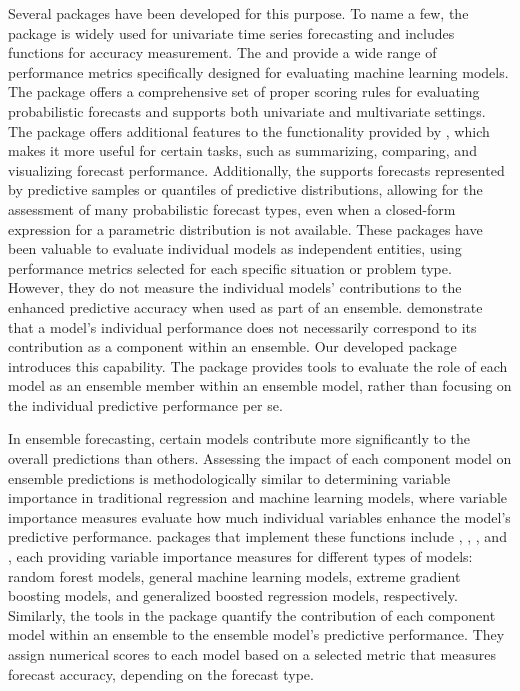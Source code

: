 \documentclass[
  article,
  shortnames,
  notitle]{jss}
\begin{document}
Several  packages have been developed for this purpose. To
name a few, the  package \citep{Rpackage-forecast} is
widely used for univariate time series forecasting and includes
functions for accuracy measurement. The 
\citep{Rpackage-Metrics} and  \citep{Rpackage-MLmetrics}
provide a wide range of performance metrics specifically designed for
evaluating machine learning models. The 
\citep{Rpackage-scoringRules} package offers a comprehensive set of
proper scoring rules for evaluating probabilistic forecasts and supports
both univariate and multivariate settings. The 
\citep{bosse2022evaluating} package offers additional features to the
functionality provided by , which makes it more useful
for certain tasks, such as summarizing, comparing, and visualizing
forecast performance. Additionally, the  supports
forecasts represented by predictive samples or quantiles of predictive
distributions, allowing for the assessment of many probabilistic
forecast types, even when a closed-form expression for a parametric
distribution is not available. These packages have been valuable to
evaluate individual models as independent entities, using performance
metrics selected for each specific situation or problem type. However,
they do not measure the individual models' contributions to the enhanced
predictive accuracy when used as part of an ensemble. \citet{kim2024}
demonstrate that a model's individual performance does not necessarily
correspond to its contribution as a component within an ensemble. Our
developed package introduces this capability. The 
package provides tools to evaluate the role of each model as an ensemble
member within an ensemble model, rather than focusing on the individual
predictive performance per se.

In ensemble forecasting, certain models contribute more significantly to
the overall predictions than others. Assessing the impact of each
component model on ensemble predictions is methodologically similar to
determining variable importance in traditional regression and machine
learning models, where variable importance measures evaluate how much
individual variables enhance the model's predictive performance.
 packages that implement these functions include
 \citep{Rpackage-randomForest}, 
\citep{Rpackage-caret},  \citep{Rpackage-xgboost}, and
 \citep{Rpackage-gbm}, each providing variable importance
measures for different types of models: random forest models, general
machine learning models, extreme gradient boosting models, and
generalized boosted regression models, respectively. Similarly, the
tools in the  package quantify the contribution of
each component model within an ensemble to the ensemble model's
predictive performance. They assign numerical scores to each model based
on a selected metric that measures forecast accuracy, depending on the
forecast type.
\end{document}

